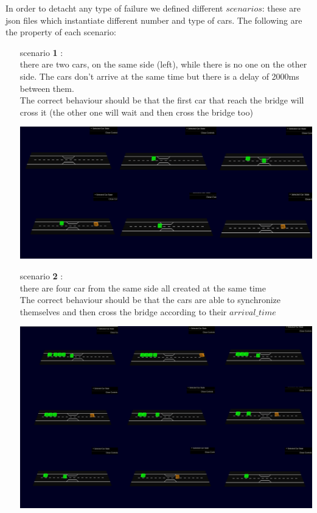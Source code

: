 In order to detacht any type of failure we defined different $scenarios$: these are json files which instantiate
different number and type of cars. The following are the property of each scenario:
\begin{itemize}
    \item[scenario \textbf{1}]: \\ there are two cars, on the same side (left), while there is no one on the other 
    side. The cars don't arrive at the same time but there is a delay of 2000ms between them. \\
    The correct behaviour should be that the first car that reach the bridge will cross it (the other 
    one will wait and then cross the bridge too) \\
    \begin{center}
        \includegraphics[scale=0.3, width=\linewidth]{assets/sc1.jpg}
    \end{center}
    \item[scenario \textbf{2}]: \\ there are four car from the same side all created at the same time \\The correct behaviour should be that 
    the cars are able to synchronize themselves and then cross the bridge according to their $arrival\_time$
    \\
    \begin{center}
        \includegraphics[scale=0.3, width=\linewidth]{assets/sc2.jpg}

\end{center}
\end{itemize}
